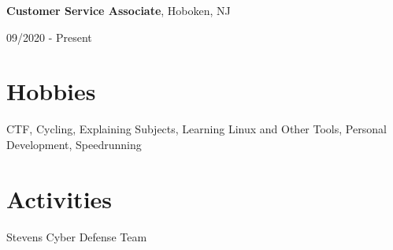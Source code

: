 \documentclass[11pt,letterpaper]{article}
\begin{document}
    \textbf{Customer Service Associate}, Hoboken, NJ \hfill
    \begin{minipage}[t]{1.2in}
      09/2020 - Present
    \end{minipage}
    
  \section{Hobbies}
    CTF, Cycling, Explaining Subjects, Learning Linux and Other Tools, Personal Development, Speedrunning
  
  \section{Activities}
    Stevens Cyber Defense Team

    
\end{document}
